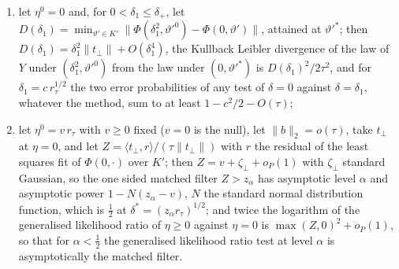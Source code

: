 \begin{theorem}
\begin{enumerate}
\item[(ii)] let $\eta^0=0$ and, for $0<\delta_1\le\delta_+$, let $D(\delta_1)=\min_{\vartheta'\in K'}\|\Phi(\delta_1^2,\vartheta'^0)-\Phi(0,\vartheta')\|$, attained at $\vartheta'^*$; then $D(\delta_1)=\delta_1^2\|t_\perp\|+O(\delta_1^4)$, the Kullback Leibler divergence of the law of $Y$ under $(\delta_1^2,\vartheta'^0)$ from the law under $(0,\vartheta'^*)$ is $D(\delta_1)^2/2\tau^2$, and for $\delta_1=c\,r_\tau^{1/2}$ the two error probabilities of any test of $\delta=0$ against $\delta=\delta_1$, whatever the method, sum to at least $1-c^2/2-O(\tau)$;
\item[(iii)] let $\eta^0=v\,r_\tau$ with $v\ge0$ fixed ($v=0$ is the null), let $\|b\|_2=o(\tau)$, take $t_\perp$ at $\eta=0$, and let $Z=\langle t_\perp,r\rangle/(\tau\|t_\perp\|)$ with $r$ the residual of the least squares fit of $\Phi(0,\cdot)$ over $K'$; then $Z=v+\zeta_\perp+o_P(1)$ with $\zeta_\perp$ standard Gaussian, so the one sided matched filter $Z>z_\alpha$ has asymptotic level $\alpha$ and asymptotic power $1-N(z_\alpha-v)$, $N$ the standard normal distribution function, which is $\tfrac12$ at $\delta^*=(z_\alpha r_\tau)^{1/2}$; and twice the logarithm of the generalised likelihood ratio of $\eta\ge0$ against $\eta=0$ is $\max(Z,0)^2+o_P(1)$, so that for $\alpha<\tfrac12$ the generalised likelihood ratio test at level $\alpha$ is asymptotically the matched filter.
\end{enumerate}
\end{theorem}

